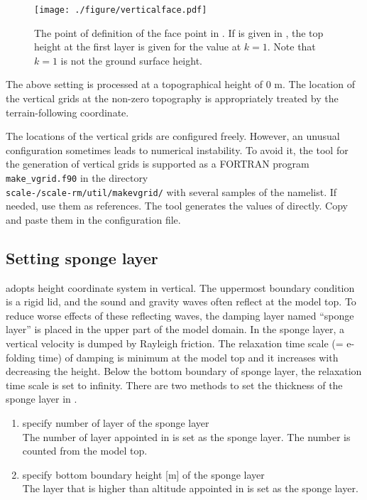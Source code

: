 \begin{figure}[tb]
\begin{center}
  \texttt{[image: ./figure/verticalface.pdf]}\\
  \caption{The point of definition of the face point in \scalerm. If  is given in , the top height at the first layer is given for the value at $k=1$. Note that $k=1$ is not the ground surface height.}
  \label{fig:scale_grid}
\end{center}
\end{figure}

The above setting is processed at a topographical height of 0 m.
The location of the vertical grids at the non-zero topography is appropriately treated by the terrain-following coordinate.

The locations of the vertical grids are configured freely.
However, an unusual configuration sometimes leads to numerical instability. To avoid it, the tool for the generation of vertical grids is supported as a FORTRAN program \verb|make_vgrid.f90| in the directory\\ \texttt{scale-\version/scale-rm/util/makevgrid/} with several samples of the namelist. If needed, use them as references. The tool generates the values of  directly. Copy and paste them in the configuration file.

\subsection{Setting sponge layer} \label{subsec:raydamp}

\scalerm adopts height coordinate system in vertical. The uppermost boundary condition is a rigid lid, and the sound and gravity waves often reflect at the model top. To reduce worse effects of these reflecting waves, the damping layer named ``sponge layer'' is placed in the upper part of the model domain. In the sponge layer, a vertical velocity is dumped by Rayleigh friction. The relaxation time scale (= e-folding time) of damping is minimum at the model top and it increases with decreasing the height. Below the bottom boundary of sponge layer, the relaxation time scale is set to infinity.
There are two methods to set the thickness of the sponge layer in .

\begin{enumerate}
\item specify number of layer of the sponge layer \\
  The number of layer appointed in  is set as the sponge layer. The number is counted from the model top.
\item specify bottom boundary height [m] of the sponge layer \\
  The layer that is higher than altitude appointed in  is set as the sponge layer.
\end{enumerate}

